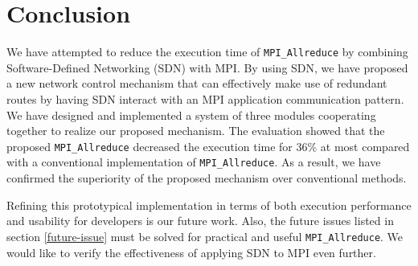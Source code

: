 \hypertarget{conclusion}{%
\section{Conclusion}\label{conclusion}}

We have attempted to reduce the execution time of
\texttt{MPI\_Allreduce} by combining Software-Defined Networking (SDN)
with MPI. By using SDN, we have proposed a new network control mechanism
that can effectively make use of redundant routes by having SDN interact
with an MPI application communication pattern. We have designed and
implemented a system of three modules cooperating together to realize
our proposed mechanism. The evaluation showed that the proposed
\texttt{MPI\_Allreduce} decreased the execution time for 36\% at most
compared with a conventional implementation of \texttt{MPI\_Allreduce}.
As a result, we have confirmed the superiority of the proposed mechanism
over conventional methods.

Refining this prototypical implementation in terms of both execution
performance and usability for developers is our future work. Also, the
future issues listed in section \ref{future-issue} must be solved for
practical and useful \texttt{MPI\_Allreduce}. We would like to verify
the effectiveness of applying SDN to MPI even further.
